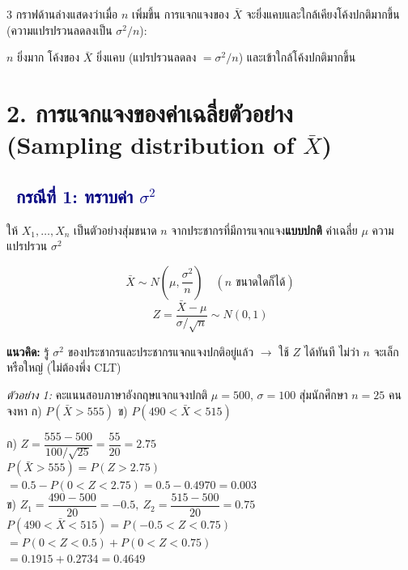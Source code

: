\documentclass[9pt]{extarticle}
\newcommand{\dist}[1]{\subsection*{\textcolor{navy}{\textbullet\ #1}}}
\begin{document}
\begin{multicols}{3}
กราฟด้านล่างแสดงว่าเมื่อ $n$ เพิ่มขึ้น การแจกแจงของ $\bar X$ จะยิ่งแคบและใกล้เคียงโค้งปกติมากขึ้น (ความแปรปรวนลดลงเป็น $\sigma^2/n$):
\begin{center}
\end{center}
{\footnotesize $n$ ยิ่งมาก โค้งของ $\bar X$ ยิ่งแคบ (แปรปรวนลดลง $=\sigma^2/n$) และเข้าใกล้โค้งปกติมากขึ้น\par}

\section*{2. การแจกแจงของค่าเฉลี่ยตัวอย่าง\\(Sampling distribution of $\bar X$)}

\dist{กรณีที่ 1: ทราบค่า $\sigma^2$}
ให้ $X_1,\dots,X_n$ เป็นตัวอย่างสุ่มขนาด $n$ จากประชากรที่มีการแจกแจง\textbf{แบบปกติ} ค่าเฉลี่ย $\mu$ ความแปรปรวน $\sigma^2$
\begin{formulabox}
$$\bar X \sim N\left(\mu,\dfrac{\sigma^2}{n}\right) \quad (n \text{ ขนาดใดก็ได้})$$
$$Z=\dfrac{\bar X-\mu}{\sigma/\sqrt{n}} \sim N(0,1)$$
\end{formulabox}
\begin{ideabox}
\textbf{แนวคิด:} รู้ $\sigma^2$ ของประชากร\allowbreak และประชากร\allowbreak แจกแจงปกติอยู่แล้ว $\to$ ใช้ $Z$ ได้ทันที ไม่ว่า $n$ จะเล็กหรือใหญ่ (ไม่ต้องพึ่ง CLT)
\end{ideabox}

\textit{ตัวอย่าง 1:} คะแนนสอบภาษาอังกฤษแจกแจงปกติ $\mu{=}500$, $\sigma{=}100$ สุ่มนักศึกษา $n{=}25$ คน จงหา ก) $P(\bar X{>}555)$ ข) $P(490{<}\bar X{<}515)$
\begin{solbox}
ก) $Z=\dfrac{555-500}{100/\sqrt{25}}=\dfrac{55}{20}=2.75$\\
$P(\bar X{>}555)=P(Z{>}2.75)$\\
$=0.5-P(0{<}Z{<}2.75)=0.5-0.4970=0.003$\\[3pt]
ข) $Z_1=\dfrac{490-500}{20}=-0.5,\ Z_2=\dfrac{515-500}{20}=0.75$\\
$P(490{<}\bar X{<}515)=P(-0.5{<}Z{<}0.75)$\\
$=P(0{<}Z{<}0.5)+P(0{<}Z{<}0.75)$\\
$=0.1915+0.2734=0.4649$
\end{solbox}


\end{multicols}
\end{document}
